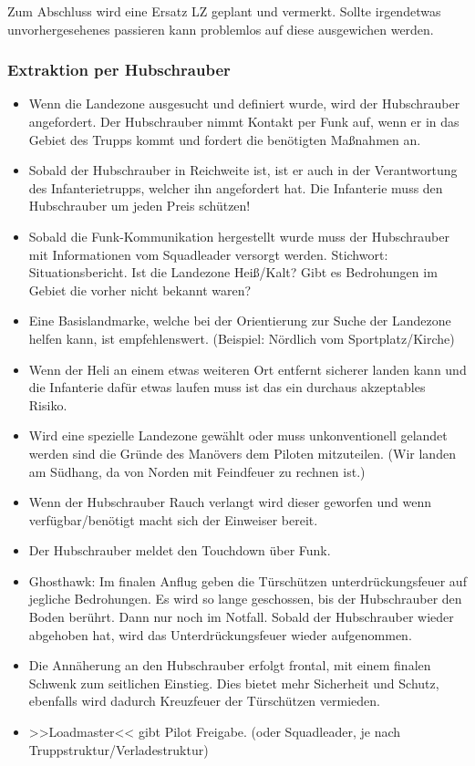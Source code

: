 	Zum Abschluss wird eine Ersatz \ac{LZ} geplant und vermerkt. Sollte irgendetwas unvorhergesehenes passieren kann problemlos auf diese ausgewichen werden.

\subsubsection{Extraktion per Hubschrauber}
 	\begin{itemize} 
		\item Wenn die Landezone ausgesucht und definiert wurde, wird der Hubschrauber angefordert. Der Hubschrauber nimmt Kontakt per Funk auf, wenn er in das Gebiet des Trupps kommt und fordert die benötigten Maßnahmen an.

		\item Sobald der Hubschrauber in Reichweite ist, ist er auch in der Verantwortung des Infanterietrupps, welcher ihn angefordert hat. Die Infanterie muss den Hubschrauber um jeden Preis schützen!

		\item Sobald die Funk-Kommunikation hergestellt wurde muss der Hubschrauber mit Informationen vom Squadleader versorgt werden. Stichwort: Situationsbericht. Ist die Landezone Heiß/Kalt? Gibt es Bedrohungen im Gebiet die vorher nicht bekannt waren?

		\item Eine Basislandmarke, welche bei der Orientierung zur Suche der Landezone helfen kann, ist empfehlenswert. (Beispiel: Nördlich vom Sportplatz/Kirche)

		\item Wenn der Heli an einem etwas weiteren Ort entfernt sicherer landen kann und die Infanterie dafür etwas laufen muss ist das ein durchaus akzeptables Risiko.

		\item Wird eine spezielle Landezone gewählt oder muss unkonventionell gelandet werden sind die Gründe des Manövers dem Piloten mitzuteilen. (Wir landen am Südhang, da von Norden mit Feindfeuer zu rechnen ist.)

		\item Wenn der Hubschrauber Rauch verlangt wird dieser geworfen und wenn verfügbar/benötigt macht sich der Einweiser bereit.

		\item Der Hubschrauber meldet den Touchdown über Funk.

		\item Ghosthawk: Im finalen Anflug geben die Türschützen unterdrückungsfeuer auf jegliche Bedrohungen. Es wird so lange geschossen, bis der Hubschrauber den Boden berührt. Dann nur noch im Notfall. Sobald der Hubschrauber wieder abgehoben hat, wird das Unterdrückungsfeuer wieder aufgenommen.

		\item Die Annäherung an den Hubschrauber erfolgt frontal, mit einem finalen Schwenk zum seitlichen Einstieg. Dies bietet mehr Sicherheit und Schutz, ebenfalls wird dadurch Kreuzfeuer der Türschützen vermieden.

		\item >>Loadmaster<< gibt Pilot Freigabe. (oder Squadleader, je nach Truppstruktur/Verladestruktur)
	\end{itemize}

